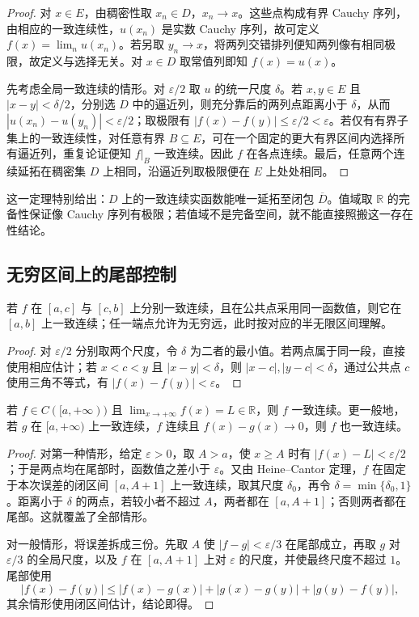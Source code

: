 \begin{proof}
对 $x\in E$，由稠密性取 $x_n\in D$，$x_n\to x$。这些点构成有界 Cauchy 序列，由相应的一致连续性，$u(x_n)$ 是实数 Cauchy 序列，故可定义 $f(x)=\lim_nu(x_n)$。若另取 $y_n\to x$，将两列交错排列便知两列像有相同极限，故定义与选择无关。对 $x\in D$ 取常值列即知 $f(x)=u(x)$。

先考虑全局一致连续的情形。对 $\varepsilon/2$ 取 $u$ 的统一尺度 $\delta$。若 $x,y\in E$ 且 $|x-y|<\delta/2$，分别选 $D$ 中的逼近列，则充分靠后的两列点距离小于 $\delta$，从而 $|u(x_n)-u(y_n)|<\varepsilon/2$；取极限有 $|f(x)-f(y)|\le\varepsilon/2<\varepsilon$。若仅有有界子集上的一致连续性，对任意有界 $B\subseteq E$，可在一个固定的更大有界区间内选择所有逼近列，重复论证便知 $f|_B$ 一致连续。因此 $f$ 在各点连续。最后，任意两个连续延拓在稠密集 $D$ 上相同，沿逼近列取极限便在 $E$ 上处处相同。
\end{proof}

这一定理特别给出：$D$ 上的一致连续实函数能唯一延拓至闭包 $\overline D$。值域取 $\mathbb R$ 的完备性保证像 Cauchy 序列有极限；若值域不是完备空间，就不能直接照搬这一存在性结论。

\subsection{无穷区间上的尾部控制}

\begin{proposition}
\label{prop:pei-uniform-gluing}
若 $f$ 在 $[a,c]$ 与 $[c,b]$ 上分别一致连续，且在公共点采用同一函数值，则它在 $[a,b]$ 上一致连续；任一端点允许为无穷远，此时按对应的半无限区间理解。
\end{proposition}

\begin{proof}
对 $\varepsilon/2$ 分别取两个尺度，令 $\delta$ 为二者的最小值。若两点属于同一段，直接使用相应估计；若 $x<c<y$ 且 $|x-y|<\delta$，则 $|x-c|,|y-c|<\delta$，通过公共点 $c$ 使用三角不等式，有 $|f(x)-f(y)|<\varepsilon$。
\end{proof}

\begin{theorem}
\label{thm:pei-uniform-tail}
若 $f\in C([a,+\infty))$ 且 $\lim_{x\to+\infty}f(x)=L\in\mathbb R$，则 $f$ 一致连续。更一般地，若 $g$ 在 $[a,+\infty)$ 上一致连续，$f$ 连续且 $f(x)-g(x)\to0$，则 $f$ 也一致连续。
\end{theorem}

\begin{proof}
对第一种情形，给定 $\varepsilon>0$，取 $A>a$，使 $x\ge A$ 时有 $|f(x)-L|<\varepsilon/2$；于是两点均在尾部时，函数值之差小于 $\varepsilon$。又由 Heine--Cantor 定理，$f$ 在固定于本次误差的闭区间 $[a,A+1]$ 上一致连续，取其尺度 $\delta_0$，再令 $\delta=\min\{\delta_0,1\}$。距离小于 $\delta$ 的两点，若较小者不超过 $A$，两者都在 $[a,A+1]$；否则两者都在尾部。这就覆盖了全部情形。

对一般情形，将误差拆成三份。先取 $A$ 使 $|f-g|<\varepsilon/3$ 在尾部成立，再取 $g$ 对 $\varepsilon/3$ 的全局尺度，以及 $f$ 在 $[a,A+1]$ 上对 $\varepsilon$ 的尺度，并使最终尺度不超过 $1$。尾部使用
\[
|f(x)-f(y)|\le|f(x)-g(x)|+|g(x)-g(y)|+|g(y)-f(y)|,
\]
其余情形使用闭区间估计，结论即得。
\end{proof}

